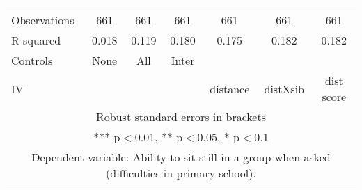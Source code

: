 \begin{tabular}{lcccccc}
 &  &  &  &  &  &  \\
Observations & 661 & 661 & 661 & 661 & 661 & 661 \\
R-squared & 0.018 & 0.119 & 0.180 & 0.175 & 0.182 & 0.182 \\
Controls & None & All & Inter &  &  &  \\
 IV &  &  &  & distance & distXsib & dist score \\ \hline
\multicolumn{7}{c}{ Robust standard errors in brackets} \\
\multicolumn{7}{c}{ *** p$<$0.01, ** p$<$0.05, * p$<$0.1} \\
\multicolumn{7}{c}{ Dependent variable: Ability to sit still in a group when asked (difficulties in primary school).} \\
\end{tabular}
